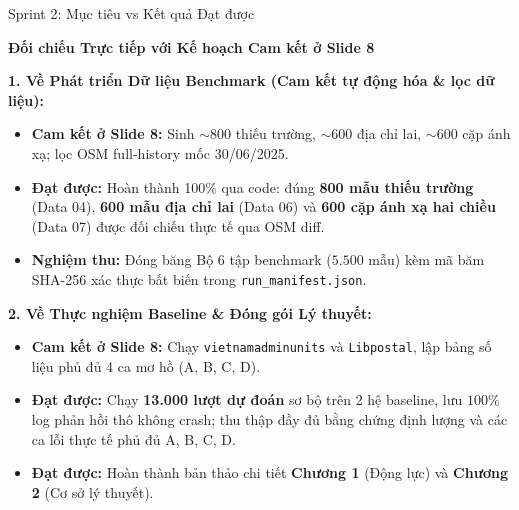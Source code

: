 \documentclass[aspectratio=169,9pt]{beamer}
\begin{document}
\begin{frame}{Sprint 2: Mục tiêu vs Kết quả Đạt được}
  \vspace{-0.05cm}
  \centerline{\large\textbf{Đối chiếu Trực tiếp với Kế hoạch Cam kết ở Slide 8}}
  \vspace{0.1cm}

  {\small
  \textbf{1. Về Phát triển Dữ liệu Benchmark (Cam kết tự động hóa \& lọc dữ liệu):}
  \begin{itemize}
    \setlength{\itemsep}{1.2pt}
    \item \textbf{Cam kết ở Slide 8:} Sinh $\sim$800 thiếu trường, $\sim$600 địa chỉ lai, $\sim$600 cặp ánh xạ; lọc OSM full-history mốc 30/06/2025.
    \item \textbf{Đạt được:} Hoàn thành 100\% qua code: đúng \textbf{800 mẫu thiếu trường} (Data 04), \textbf{600 mẫu địa chỉ lai} (Data 06) và \textbf{600 cặp ánh xạ hai chiều} (Data 07) được đối chiếu thực tế qua OSM diff.
    \item \textbf{Nghiệm thu:} Đóng băng Bộ 6 tập benchmark ($5.500$ mẫu) kèm mã băm SHA-256 xác thực bất biến trong \texttt{run\_manifest.json}.
  \end{itemize}

  \vspace{0.08cm}
  \textbf{2. Về Thực nghiệm Baseline \& Đóng gói Lý thuyết:}
  \begin{itemize}
    \setlength{\itemsep}{1.2pt}
    \item \textbf{Cam kết ở Slide 8:} Chạy \texttt{vietnamadminunits} và \texttt{Libpostal}, lập bảng số liệu phủ đủ 4 ca mơ hồ (A, B, C, D).
    \item \textbf{Đạt được:} Chạy \textbf{13.000 lượt dự đoán} sơ bộ trên 2 hệ baseline, lưu $100\%$ log phản hồi thô không crash; thu thập đầy đủ bằng chứng định lượng và các ca lỗi thực tế phủ đủ A, B, C, D.
    \item \textbf{Đạt được:} Hoàn thành bản thảo chi tiết \textbf{Chương 1} (Động lực) và \textbf{Chương 2} (Cơ sở lý thuyết).
  \end{itemize}
  }
\end{frame}
\end{document}
